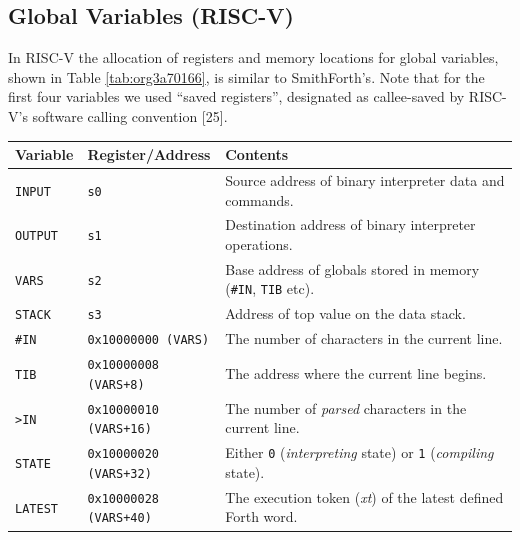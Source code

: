\documentclass[a4paper,12pt,final]{article}
\makeatletter
\newcommand{\citeprocitem}[2]{\hyper@linkstart{cite}{citeproc_bib_item_#1}#2\hyper@linkend}
\makeatother
\begin{document}
\subsection{Global Variables (RISC-V)}
\label{sec:org42fb1b3}

In RISC-V the allocation of registers and memory locations for global
variables, shown in Table \ref{tab:org3a70166}, is similar to SmithForth's.
Note that for the first four variables we used ``saved registers'',
designated as callee-saved by RISC-V's software calling convention
\citeprocitem{25}{[25]}.

\begin{table}[!htbp] \begin{adjustwidth}{-1cm}{-1cm} \fontsize{10}{12.000000}\selectfont
\begin{center}
\begin{tabular}{l|l|l}
\textbf{Variable} & \textbf{Register}​/​\textbf{Address} & \textbf{Contents}\\[0pt]
\hline
\texttt{INPUT} & \texttt{s0} & Source address of binary interpreter data and commands.\\[0pt]
\texttt{OUTPUT} & \texttt{s1} & Destination address of binary interpreter operations.\\[0pt]
\texttt{VARS} & \texttt{s2} & Base address of globals stored in memory (\texttt{\#IN}, \texttt{TIB} etc).\\[0pt]
\texttt{STACK} & \texttt{s3} & Address of top value on the data stack.\\[0pt]
\hline
\texttt{\#IN} & \texttt{0x10000000 (VARS)} & The number of characters in the current line.\\[0pt]
\texttt{TIB} & \texttt{0x10000008 (VARS+8)} & The address where the current line begins.\\[0pt]
\texttt{>IN} & \texttt{0x10000010 (VARS+16)} & The number of \emph{parsed} characters in the current line.\\[0pt]
\texttt{STATE} & \texttt{0x10000020 (VARS+32)} & Either \texttt{0} (\emph{interpreting} state) or \texttt{1} (\emph{compiling} state).\\[0pt]
\texttt{LATEST} & \texttt{0x10000028 (VARS+40)} & The execution token (\emph{xt}) of the latest defined Forth word.\\[0pt]
\end{tabular}

\end{center}
\normalsize \end{adjustwidth} \end{table} \vspace{0}
\end{document}
